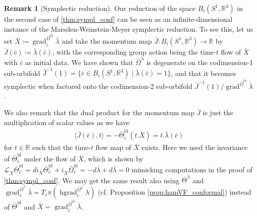 \documentclass[12pt]{amsart}
\newcommand{\AuthorCOMMENT}[3]{\textcolor{#2}{{[\textbf{#1:} \textsl{#3}}]}}  %
\newcommand{\cSI}[1]{\AuthorCOMMENT{Sadashige}{violet}{#1}}
\theoremstyle{definition}
\newtheorem{remark}[theorem]{Remark}
\newcommand{\R}{\mathbb R}
\newcommand{\id}{\mathrm{id}}
\def\Th{\Theta}
\def\Om{\Omega}
\def\x{\times}
\def\L{\mathcal{L}}
\def\R{{\mathbb R}}
\let\on=\operatorname
\begin{document}
\begin{remark}[Symplectic reduction]
    Our reduction of the space $B_i(S^1,\R^3)$ in the second case of \autoref{thm:sympl_conf} can be  seen as an infinite-dimensional instance of the Marsden-Weinstein-Meyer symplectic reduction. 
    To see this, let us set $\bar X\coloneqq \on{grad}_{\bar c}^{\bar \Om^{\on{id}}} \bar \lambda$ and take the momentum map $\bar J\colon B_i(S^1,\R^3)\to \R$ by $\bar J(\bar c)\coloneqq \bar \lambda(\bar c)$, with the corresponding group action being the time-$t$ flow of $\bar X$ with $\bar c$ as initial data. We have shown that $\bar \Omega^{\lambda}$ is degenerate on the codimension-1 sub-orbifold $\bar J^{-1}(1)=\{\bar c \in B_i(S^1,\R^3) \mid \bar \lambda(\bar c)=1\}$, and that it becomes symplectic when factored onto the codimension-2 sub-orbifold $\bar J^{-1}(1)/ \on{grad}^{\bar \Om^{\on{id}}} \bar \lambda$.
    
    We also remark that the dual product for the momentum map $\bar J$ is just the multiplication of scalar values as we have
    \begin{align}
        \langle \bar J(\bar c), t\rangle = -\bar \Th_{\bar c}^\id(t.\bar X)=t. \bar \lambda(\bar c)
    \end{align}
    for $t\in \R$ such that the time-$t$ flow map of $\bar X$ exists.  Here we used the invariance of $\bar \Th_{\bar c}^\id$ under the flow of $\bar X$, which is shown by $\L_{\bar X} \bar \Th_{\bar c}^\id=d i_{\bar X} \bar \Th_{\bar c}^\id + i_{\bar X} \bar \Om_{\bar c}^\id= -d\bar \lambda +d\bar \lambda=0$ mimicking computations in the proof of \autoref{thm:sympl_conf}. We may get the same result also using $\bar \Th^\lambda$ and $ \on{grad}_{\bar c}^{\bar \Om^\lambda} \bar \lambda = T_c \pi (\on{hgrad}_c^{\Om^\lambda} \lambda)$ (cf. Proposition \ref{prop:hamVF_conformal}) instead of $\bar \Th^{\id}$ and $\bar X= \on{grad}_{\bar c}^{\bar \Om^{\on{id}}} \bar \lambda$.
\end{remark}
\end{document}
